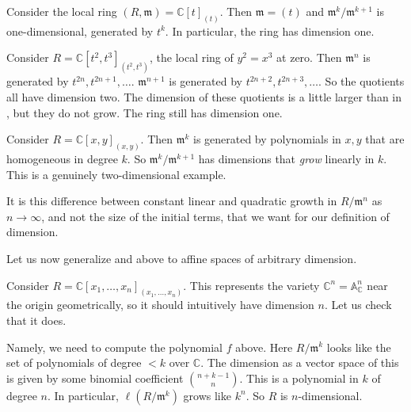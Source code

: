 \begin{example} \label{easydimcomputation}
\label{dimaffineline}
Consider the local ring $(R, \mathfrak{m}) = \mathbb{C}[t]_{(t)}$. Then $\mathfrak{m} = (t)$ and
$\mathfrak{m}^k/\mathfrak{m}^{k+1}$ is one-dimensional, generated by $t^k$. In
particular, the ring has dimension one. 
\end{example} 

\begin{example} Consider $R = \mathbb{C}[t^2, t^3]_{(t^2, t^3)}$, the local ring of $y^2 = x^3$
at zero. Then $\mathfrak{m}^n$ is generated by $t^{2n}, t^{2n+1}, \dots$.
$\mathfrak{m}^{n+1}$ is generated by $t^{2n+2}, t^{2n+3}, \dots$. So the
quotients all have dimension two. The dimension of these quotients is a little
larger than in , but they do not grow. The ring still has dimension one. 
\end{example} 

\begin{example} \label{dimaffineplane}
Consider $R = \mathbb{C}[x,y]_{(x,y)}$. Then $\mathfrak{m}^k$ is generated by
polynomials in $x,y$ that are homogeneous in degree $k$. So $\mathfrak{m}^k/\mathfrak{m}^{k+1}$
has dimensions that \emph{grow} linearly in $k$. This is a genuinely two-dimensional
example. 
\end{example} 

It is this difference between constant linear and quadratic growth in
$R/\mathfrak{m}^n$ as $n \to \infty$, and not the size of the initial terms,
that we want for our definition of dimension.

Let us now generalize  and 
above to affine spaces of arbitrary dimension. 
\begin{example} 
Consider $R = \mathbb{C}[x_1, \dots, x_n]_{(x_1, \dots, x_n)}$. 
This represents the variety $\mathbb{C}^n = \mathbb{A}^n_{\mathbb{C}}$ near the origin geometrically, so
it should intuitively have dimension $n$. Let us check that it does. 

Namely, we need to compute the polynomial $f$ above. Here $R/\mathfrak{m}^k$ looks like the set of
polynomials of degree $<k$ over $\mathbb{C}$. The dimension as a vector space
of this is
given by some binomial coefficient $\binom{n+k-1}{n}$. This is a polynomial in
$k$ of degree $n$. In particular, $\ell(R/\mathfrak{m}^k)$ grows like $k^n$.
So $R$ is $n$-dimensional. 
\end{example} 



